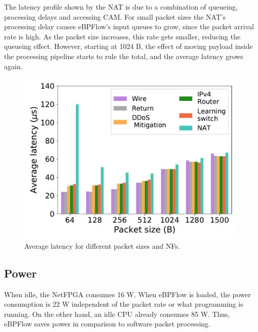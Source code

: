 The latency profile shown by the NAT is due to a combination of queueing, processing delays and accessing CAM. For small packet sizes the NAT's processing delay causes eBPFlow's input queues to grow, since the packet arrival rate is high. As the packet size increases, this rate gets smaller, reducing the queueing effect. However, starting at 1024 B, the effect of moving payload inside the processing pipeline starts to rule the total, and the average latency grows again.

\begin{figure}[t]
\centering
\includegraphics[width=\columnwidth]{figures/latency.pdf}
\caption{Average latency for different packet sizes and NFs.}
\label{fig:latency}
\end{figure}

\subsection{Power}
\label{sec:power}


When idle, the NetFPGA consumes 16 W.
When eBPFlow is loaded, the power consumption is 22 W independent of the packet rate or what programming is running.
On the other hand, an idle CPU already consumes 85 W.
Thus, eBPFlow saves power in comparison to software packet processing.


